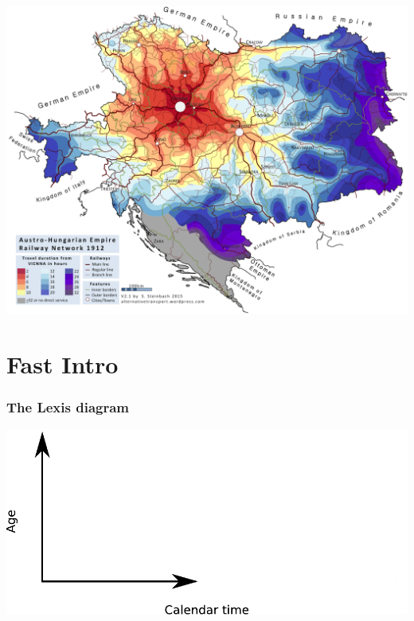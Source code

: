 \documentclass[20pt]{beamer}
\begin{document}
\begin{frame}
\vspace{-11em}
\begin{center}
\hspace*{-2cm}\includegraphics[scale=.9]{Figures/austro-hungarian-empire-railway-network-1912-2-1-smallmid-size.png}
\end{center}
\end{frame}
%

\section{Fast Intro}

\begin{frame}
\frametitle{The Lexis diagram}
\includegraphics[scale=1.5]{Figures/APCrt0.pdf}\\
\end{frame}
\end{document}
